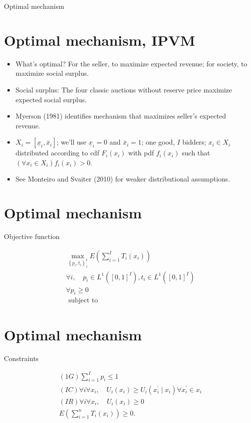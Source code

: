 \documentclass[10pt]{article}
\begin{document}
Optimal mechanism

\section*{Optimal mechanism, IPVM}
\begin{itemize}
  \item What's optimal? For the seller, to maximize expected revenue; for society, to maximize social surplus.
  \item Social surplus: The four classic auctions without reserve price maximize expected social surplus.
  \item Myerson (1981) identifies mechanism that maximizes seller's expected revenue.
  \item $X_{i}=\left[\underline{x}_{i}, \bar{x}_{i}\right]$; we'll use $\underline{x}_{i}=0$ and $\bar{x}_{i}=1$; one good, $I$ bidders; $x_{i} \in X_{i}$ distributed according to cdf $F_{i}\left(x_{i}\right)$ with pdf $f_{i}\left(x_{i}\right)$ such that $\left(\forall x_{i} \in X_{i}\right) f_{i}\left(x_{i}\right)>0$.
  \item See Monteiro and Svaiter (2010) for weaker distributional assumptions.
\end{itemize}

\section*{Optimal mechanism}
Objective function

$$
\begin{aligned}
& \max _{\left\{p_{i}, t_{i}\right\}_{1}^{I}} E\left(\sum_{i=1}^{I} T_{i}\left(x_{i}\right)\right) \\
& \forall i, \quad p_{i} \in L^{1}\left([0,1]^{I}\right), t_{i} \in L^{1}\left([0,1]^{I}\right) \\
& \forall p_{i} \geq 0 \\
& \text { subject to }
\end{aligned}
$$

\section*{Optimal mechanism}
Constraints

$$
\begin{aligned}
& (1 G) \sum_{i=1}^{I} p_{i} \leq 1 \\
& (I C) \forall i \forall x_{i}, \quad U_{i}\left(x_{i}\right) \geq U_{i}\left(x_{i}^{\prime} \mid x_{i}\right) \forall x_{i}^{\prime} \in x_{i} \\
& (I R) \forall i \forall x_{i}, \quad U_{i}\left(x_{i}\right) \geq 0 \\
& E\left(\sum_{i=1}^{n} T_{i}\left(x_{i}\right)\right) \geq 0 .
\end{aligned}
$$
\end{document}
